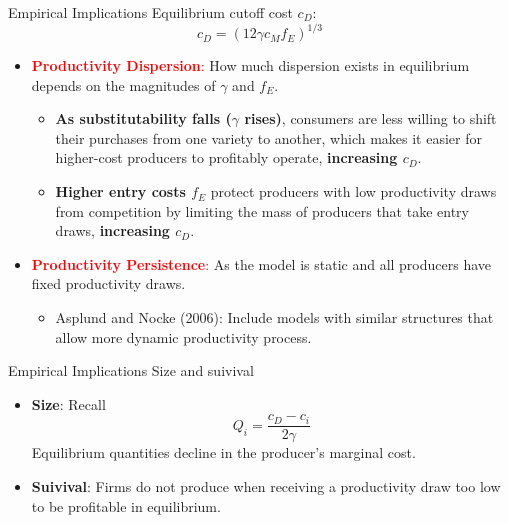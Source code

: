 \documentclass[aspectratio=169]{beamer}  %
\begin{document}
\begin{frame}{Empirical Implications}
    Equilibrium cutoff cost \(c_D\):
    \[
    c_D = (12 \gamma c_{M} f_{E})^{1/3}
    \]
    \begin{itemize}
        \item \textcolor{red}{\textbf{Productivity Dispersion}:} How much dispersion exists in equilibrium depends on the magnitudes of \(\gamma\) and \(f_E\).
        \begin{itemize}
            \item \textbf{As substitutability falls (\(\gamma\) rises)}, consumers are less willing to shift their purchases from one variety to another, which makes it easier for higher-cost producers to profitably operate, \textbf{increasing \(c_D\)}.
            \item \textbf{Higher entry costs \(f_E\)} protect producers with low productivity draws from competition by limiting the mass of producers that take entry draws, \textbf{increasing \(c_D\)}.
        \end{itemize}
        \item \textcolor{red}{\textbf{Productivity Persistence}:} As the model is static and all producers have fixed productivity draws.
        \begin{itemize}
            \item Asplund and Nocke (2006): Include models with similar structures that allow more dynamic productivity process.
        \end{itemize} 
    \end{itemize}
\end{frame}

\begin{frame}{Empirical Implications}
    Size and suivival
    \begin{itemize}
        \item \textbf{Size}: Recall
        \[
          Q_i = \frac{c_D - c_i}{2\gamma}
        \]
        Equilibrium quantities decline in the producer's marginal cost.
        \item \textbf{Suivival}: Firms do not produce when receiving a productivity draw too low to be profitable in equilibrium.
    \end{itemize}
\end{frame}


\end{document}
